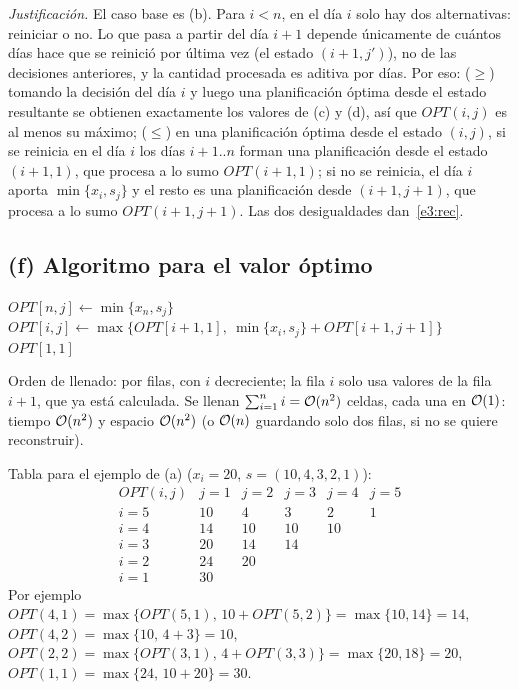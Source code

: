 \emph{Justificación.} El caso base es (b). Para $i<n$, en el día $i$ solo hay dos alternativas: reiniciar o no. Lo que pasa a partir del día $i+1$ depende únicamente de cuántos días hace que se reinició por última vez (el estado $(i+1,j')$), no de las decisiones anteriores, y la cantidad procesada es aditiva por días. Por eso:
($\ge$) tomando la decisión del día $i$ y luego una planificación óptima desde el estado resultante se obtienen exactamente los valores de (c) y (d), así que $OPT(i,j)$ es al menos su máximo;
($\le$) en una planificación óptima desde el estado $(i,j)$, si se reinicia en el día $i$ los días $i+1..n$ forman una planificación desde el estado $(i+1,1)$, que procesa a lo sumo $OPT(i+1,1)$; si no se reinicia, el día $i$ aporta $\min\{x_i,s_j\}$ y el resto es una planificación desde $(i+1,j+1)$, que procesa a lo sumo $OPT(i+1,j+1)$. Las dos desigualdades dan~\eqref{e3:rec}.

\subsection*{(f) Algoritmo para el valor óptimo}

\begin{algorithm}[H]
\caption{Máximo de terabytes procesados}
\begin{algorithmic}[1]
    \State $OPT[n,j]\gets \min\{x_n,s_j\}$
  \EndFor
      \State $OPT[i,j]\gets \max\{OPT[i+1,1],\ \min\{x_i,s_j\}+OPT[i+1,j+1]\}$
    \EndFor
  \EndFor
  \State \Return $OPT[1,1]$
\EndFunction
\end{algorithmic}
\end{algorithm}

Orden de llenado: por filas, con $i$ decreciente; la fila $i$ solo usa valores de la fila $i+1$, que ya está calculada. Se llenan $\sum_{i=1}^n i=\mathcal{O}(n^2)$ celdas, cada una en $\mathcal{O}(1)$: tiempo $\mathcal{O}(n^2)$ y espacio $\mathcal{O}(n^2)$ (o $\mathcal{O}(n)$ guardando solo dos filas, si no se quiere reconstruir).

Tabla para el ejemplo de (a) ($x_i=20$, $s=(10,4,3,2,1)$):
\[
\begin{array}{c|ccccc}
OPT(i,j) & j=1 & j=2 & j=3 & j=4 & j=5\\\hline
i=5 & 10 & 4 & 3 & 2 & 1\\
i=4 & 14 & 10 & 10 & 10 & \\
i=3 & 20 & 14 & 14 & & \\
i=2 & 24 & 20 & & & \\
i=1 & 30 & & & &
\end{array}
\]
Por ejemplo $OPT(4,1)=\max\{OPT(5,1),\,10+OPT(5,2)\}=\max\{10,14\}=14$, $OPT(4,2)=\max\{10,\,4+3\}=10$, $OPT(2,2)=\max\{OPT(3,1),\,4+OPT(3,3)\}=\max\{20,18\}=20$, $OPT(1,1)=\max\{24,\,10+20\}=30$.

